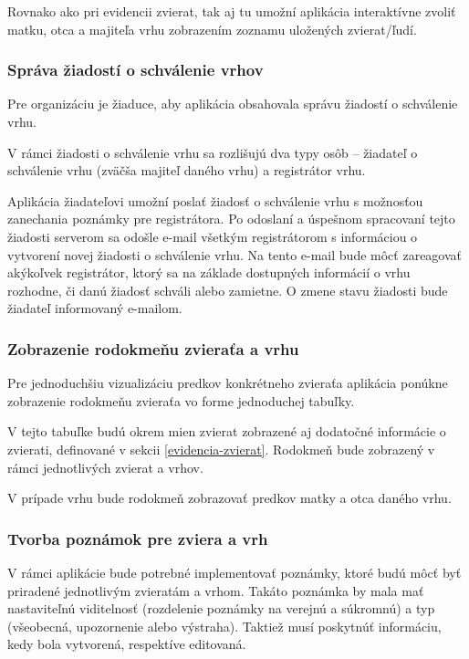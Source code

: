 Rovnako ako pri evidencii zvierat, tak aj tu umožní aplikácia interaktívne zvoliť matku, otca a majiteľa vrhu zobrazením zoznamu uložených zvierat/ľudí.

\subsubsection{Správa žiadostí o schválenie vrhov}\label{sprava-ziadosti-o-schvalenie-vrhu}
Pre organizáciu je žiaduce, aby aplikácia obsahovala správu žiadostí o schválenie vrhu.

V rámci žiadosti o schválenie vrhu sa rozlišujú dva typy osôb -- žiadateľ o schválenie vrhu (zväčša majiteľ daného vrhu) a registrátor vrhu.

Aplikácia žiadateľovi umožní poslať žiadosť o schválenie vrhu s možnosťou zanechania poznámky pre registrátora.
Po odoslaní a úspešnom spracovaní tejto žiadosti serverom sa odošle e-mail všetkým registrátorom s informáciou o vytvorení novej žiadosti o schválenie vrhu. Na tento e-mail bude môcť zareagovať akýkoľvek registrátor, ktorý sa na základe dostupných informácií o vrhu rozhodne, či danú žiadosť schváli alebo zamietne.
O zmene stavu žiadosti bude žiadateľ informovaný e-mailom.

\subsubsection{Zobrazenie rodokmeňu zvieraťa a vrhu}\label{rodokmene}
Pre jednoduchšiu vizualizáciu predkov konkrétneho zvieraťa aplikácia ponúkne zobrazenie rodokmeňu zvieraťa vo forme jednoduchej tabuľky.

V tejto tabuľke budú okrem mien zvierat zobrazené aj dodatočné informácie o zvierati, definované v sekcii \ref{evidencia-zvierat}. Rodokmeň bude zobrazený v rámci jednotlivých zvierat a vrhov.

V prípade vrhu bude rodokmeň zobrazovať predkov matky a otca daného vrhu.

\subsubsection{Tvorba poznámok pre zviera a vrh}
V rámci aplikácie bude potrebné implementovať poznámky, ktoré budú môcť byť priradené jednotlivým zvieratám a vrhom.
Takáto poznámka by mala mať nastaviteľnú viditelnosť (rozdelenie poznámky na verejnú a súkromnú) a typ (všeobecná, upozornenie alebo výstraha).
Taktiež musí poskytnúť informáciu, kedy bola vytvorená, respektíve editovaná.


